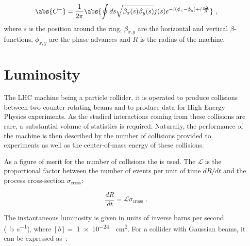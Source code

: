 \begin{equation}
    \abs{C^{-}} = \frac{1}{2 \pi} \abs{ \oint ds \sqrt{\beta_x(s) \beta_y(s)} j(s) e^{-i \left( \phi_x - \phi_y \right) + i \frac{s \Delta}{R}} } \text{ ,}
    \label{equation:deltaqmin_guignard}
\end{equation}
where \(s\) is the position around the ring, \(\beta_{x,y}\) are the horizontal and vertical \(\beta\)-functions, \(\phi_{x,y}\) are the phase advances and \(R\) is the radius of the machine.



\section{Luminosity}
\label{section:luminosity}

The LHC machine being a particle collider, it is operated to produce collisions between two counter-rotating beams and to produce data for High Energy Physics experiments.
As the studied interactions coming from these collisions are rare, a substantial volume of statistics is required. 
Naturally, the performance of the machine is then described by the number of collisions provided to experiments as well as the center-of-mass energy of these collisions.

As a figure of merit for the number of collisions the  is used.
The  \(\mathcal{L}\) is the proportional factor between the number of events per unit of time \(dR / dt\) and the process cross-section \(\sigma_{\mathrm{cross}}\):

\begin{equation}
    \dfrac{dR}{dt} = \mathcal{L} \sigma_{\mathrm{cross}} \text{ .}
    \label{equation:instantaneous_luminosity_definition}
\end{equation}

The instantaneous luminosity is given in units of inverse barns per second (\unit{\per\barn\per\second}), where \(\left[ b \right] = \) \qty{1e-24}{\per\square\centi\meter}.
For a collider with Gaussian beams, it can be expressed as~\cite{CERN:Herr:Concept_Luminosity}:

